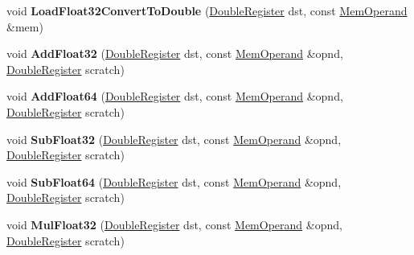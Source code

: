 \begin{DoxyCompactItemize}
void {\bfseries Load\+Float32\+Convert\+To\+Double} (\mbox{\hyperlink{classv8_1_1internal_1_1DoubleRegister}{Double\+Register}} dst, const \mbox{\hyperlink{classv8_1_1internal_1_1MemOperand}{Mem\+Operand}} \&mem)
\item 
\mbox{\label{classv8_1_1internal_1_1TurboAssembler_a93032508c56284b9e09e7f422d9ee8b4}} 
void {\bfseries Add\+Float32} (\mbox{\hyperlink{classv8_1_1internal_1_1DoubleRegister}{Double\+Register}} dst, const \mbox{\hyperlink{classv8_1_1internal_1_1MemOperand}{Mem\+Operand}} \&opnd, \mbox{\hyperlink{classv8_1_1internal_1_1DoubleRegister}{Double\+Register}} scratch)
\item 
\mbox{\label{classv8_1_1internal_1_1TurboAssembler_aaffd57641d7ef8546b76ef156df55039}} 
void {\bfseries Add\+Float64} (\mbox{\hyperlink{classv8_1_1internal_1_1DoubleRegister}{Double\+Register}} dst, const \mbox{\hyperlink{classv8_1_1internal_1_1MemOperand}{Mem\+Operand}} \&opnd, \mbox{\hyperlink{classv8_1_1internal_1_1DoubleRegister}{Double\+Register}} scratch)
\item 
\mbox{\label{classv8_1_1internal_1_1TurboAssembler_a3b2ef4a066bb0a7ca3eca9768204fd05}} 
void {\bfseries Sub\+Float32} (\mbox{\hyperlink{classv8_1_1internal_1_1DoubleRegister}{Double\+Register}} dst, const \mbox{\hyperlink{classv8_1_1internal_1_1MemOperand}{Mem\+Operand}} \&opnd, \mbox{\hyperlink{classv8_1_1internal_1_1DoubleRegister}{Double\+Register}} scratch)
\item 
\mbox{\label{classv8_1_1internal_1_1TurboAssembler_aa525ee8cda2287379e21a8c705f05671}} 
void {\bfseries Sub\+Float64} (\mbox{\hyperlink{classv8_1_1internal_1_1DoubleRegister}{Double\+Register}} dst, const \mbox{\hyperlink{classv8_1_1internal_1_1MemOperand}{Mem\+Operand}} \&opnd, \mbox{\hyperlink{classv8_1_1internal_1_1DoubleRegister}{Double\+Register}} scratch)
\item 
\mbox{\label{classv8_1_1internal_1_1TurboAssembler_a1a45dd28a2a01a2fc9f01d1cb6c5ce01}} 
void {\bfseries Mul\+Float32} (\mbox{\hyperlink{classv8_1_1internal_1_1DoubleRegister}{Double\+Register}} dst, const \mbox{\hyperlink{classv8_1_1internal_1_1MemOperand}{Mem\+Operand}} \&opnd, \mbox{\hyperlink{classv8_1_1internal_1_1DoubleRegister}{Double\+Register}} scratch)

\end{DoxyCompactItemize}
